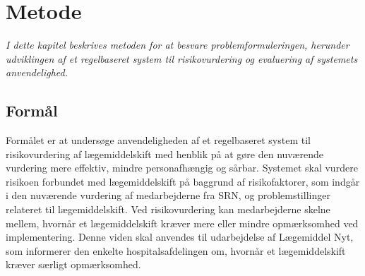 \chapter{Metode}
\textit{I dette kapitel beskrives metoden for at besvare problemformuleringen, herunder udviklingen af et regelbaseret system til risikovurdering og evaluering af systemets anvendelighed.}

\section{Formål}
Formålet er at undersøge anvendeligheden af et regelbaseret system til risikovurdering af lægemiddelskift med henblik på at gøre den nuværende vurdering mere effektiv, mindre personafhængig og sårbar. Systemet skal vurdere risikoen forbundet med lægemiddelskift på baggrund af risikofaktorer, som indgår i den nuværende vurdering af medarbejderne fra SRN, og problemstillinger relateret til lægemiddelskift. Ved risikovurdering kan medarbejderne skelne mellem,  hvornår et lægemiddelskift kræver mere eller mindre opmærksomhed ved implementering. Denne viden skal anvendes til udarbejdelse af Lægemiddel Nyt, som informerer den enkelte hospitalsafdelingen om, hvornår et lægemiddelskift kræver særligt opmærksomhed.







